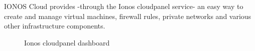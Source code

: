 IONOS Cloud provides -through the Ionos cloudpanel service- an easy way to create and manage virtual machines, firewall rules, private networks and various other infrastructure components.
\begin{figure}[H]
    \centering
    \caption{Ionos cloudpanel dashboard}
    \label{fig:image-of-ionos-cloudpanel-dashboard}
\end{figure}


